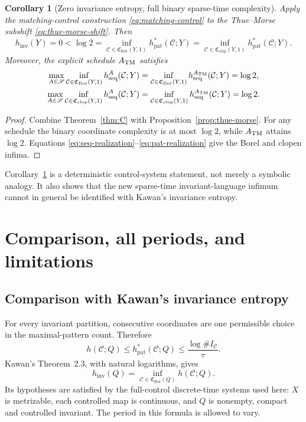 \documentclass[11pt,reqno]{amsart}
\numberwithin{equation}{section}
\newtheorem{corollary}[theorem]{Corollary}
\theoremstyle{definition}
\newcommand{\C}{\mathcal C}
\newcommand{\hseq}{h_{\mathrm{seq}}}
\newcommand{\hpat}{h_{\mathrm{pat}}^{*}}
\newcommand{\hinv}{h_{\mathrm{inv}}}
\newcommand{\Bor}{\mathrm{Bor}}
\newcommand{\clop}{\mathrm{clop}}
\begin{document}
\begin{corollary}[Zero invariance entropy, full binary sparse-time complexity]
\label{cor:separation}
Apply the matching-control construction \eqref{eq:matching-control} to the
Thue--Morse subshift \eqref{eq:thue-morse-shift}.  Then
\begin{equation}\label{eq:strict-control-separation}
 \hinv(Y)=0
 <\log2
 =\inf_{\C\in\mathfrak C_{\Bor}(Y,1)}\hpat(\C;Y)
 =\inf_{\C\in\mathfrak C_{\clop}(Y,1)}\hpat(\C;Y).
\end{equation}
Moreover, the explicit schedule $A_{\rm TM}$ satisfies
\begin{align}
 \max_{A\in\mathscr S}\inf_{\C\in\mathfrak C_{\Bor}(Y,1)}
 \hseq^A(\C;Y)
 &=\inf_{\C\in\mathfrak C_{\Bor}(Y,1)}\hseq^{A_{\rm TM}}(\C;Y)
 =\log2,
 \label{eq:TM-Borel-sequence}\\
 \max_{A\in\mathscr S}\inf_{\C\in\mathfrak C_{\clop}(Y,1)}
 \hseq^A(\C;Y)
 &=\inf_{\C\in\mathfrak C_{\clop}(Y,1)}\hseq^{A_{\rm TM}}(\C;Y)
 =\log2.
 \label{eq:TM-clopen-sequence}
\end{align}
\end{corollary}

\begin{proof}
Combine Theorem~\ref{thm:C} with Proposition~\ref{prop:thue-morse}.  For any
schedule the binary coordinate complexity is at most $\log2$, while
$A_{\rm TM}$ attains $\log2$.  Equations
\eqref{eq:seq-realization}--\eqref{eq:pat-realization} give the Borel and
clopen infima.
\end{proof}

Corollary~\ref{cor:separation} is a deterministic control-system statement,
not merely a symbolic analogy.  It also shows that the new sparse-time
invariant-language infimum cannot in general be identified with Kawan's
invariance entropy.

\section{Comparison, all periods, and limitations}\label{sec:comparison}

\subsection{Comparison with Kawan's invariance entropy}
For every invariant partition, consecutive coordinates are one permissible
choice in the maximal-pattern count. Therefore
\begin{equation}\label{eq:ordinary-pattern-one-sided}
 h(\C;Q)\le\hpat(\C;Q)\le\frac{\log\#I_\C}{\tau}.
\end{equation}
Kawan's Theorem~2.3, with natural logarithms, gives
\begin{equation}\label{eq:kawan-characterization}
 \hinv(Q)=\inf_{\C\in\mathfrak C_{\Bor}(Q)}h(\C;Q).
\end{equation}
Its hypotheses are satisfied by the full-control discrete-time systems
used here: $X$ is metrizable, each controlled map is continuous, and
$Q$ is nonempty, compact and controlled invariant.
The period in this formula is allowed to vary.
\end{document}
